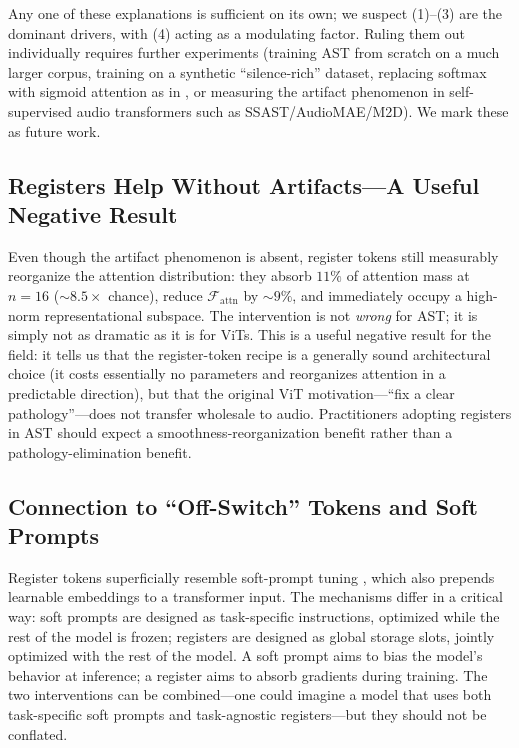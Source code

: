 \documentclass[conference]{IEEEtran}
\begin{document}
Any one of these explanations is sufficient on its own; we suspect (1)--(3) are the dominant drivers, with (4) acting as a modulating factor. Ruling them out individually requires further experiments (training AST from scratch on a much larger corpus, training on a synthetic ``silence-rich'' dataset, replacing softmax with sigmoid attention as in \cite{gu2025emergence}, or measuring the artifact phenomenon in self-supervised audio transformers such as SSAST/AudioMAE/M2D). We mark these as future work.

\subsection{Registers Help Without Artifacts---A Useful Negative Result}

Even though the artifact phenomenon is absent, register tokens still measurably reorganize the attention distribution: they absorb $11\%$ of attention mass at $n=16$ ($\sim 8.5\times$ chance), reduce $\mathcal{F}_{\text{attn}}$ by $\sim 9\%$, and immediately occupy a high-norm representational subspace. The intervention is not \emph{wrong} for AST; it is simply not as dramatic as it is for ViTs. This is a useful negative result for the field: it tells us that the register-token recipe is a generally sound architectural choice (it costs essentially no parameters and reorganizes attention in a predictable direction), but that the original ViT motivation---``fix a clear pathology''---does not transfer wholesale to audio. Practitioners adopting registers in AST should expect a smoothness-reorganization benefit rather than a pathology-elimination benefit.

\subsection{Connection to ``Off-Switch'' Tokens and Soft Prompts}

Register tokens superficially resemble soft-prompt tuning \cite{lester2021power}, which also prepends learnable embeddings to a transformer input. The mechanisms differ in a critical way: soft prompts are designed as task-specific instructions, optimized while the rest of the model is frozen; registers are designed as global storage slots, jointly optimized with the rest of the model. A soft prompt aims to bias the model's behavior at inference; a register aims to absorb gradients during training. The two interventions can be combined---one could imagine a model that uses both task-specific soft prompts and task-agnostic registers---but they should not be conflated.
\end{document}
